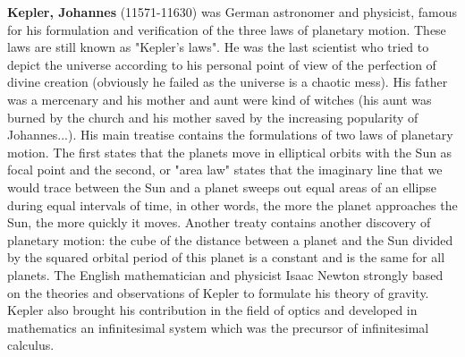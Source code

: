 {}
\label{sec:K}

\textbf{Kepler, Johannes} (11571-11630) was German astronomer and physicist, famous for his formulation and verification of the three laws of planetary motion. These laws are still known as "Kepler's laws". He was the last scientist who tried to depict the universe according to his personal point of view of the perfection of divine creation (obviously he failed as the universe is a chaotic mess). His father was a mercenary and his mother and aunt were kind of witches (his aunt was burned by the church and his mother saved by the increasing popularity of Johannes...). His main treatise contains the formulations of two laws of planetary motion. The first states that the planets move in elliptical orbits with the Sun as focal point and the second, or "area law" states that the imaginary line that we would trace between the Sun and a planet sweeps out equal areas of an ellipse during equal intervals of time, in other words, the more the planet approaches the Sun, the more quickly it moves. Another treaty contains another discovery of planetary motion: the cube of the distance between a planet and the Sun divided by the squared orbital period of this planet is a constant and is the same for all planets. The English mathematician and physicist Isaac Newton strongly based on the theories and observations of Kepler to formulate his theory of gravity. Kepler also brought his contribution in the field of optics and developed in mathematics an infinitesimal system which was the precursor of infinitesimal calculus.

